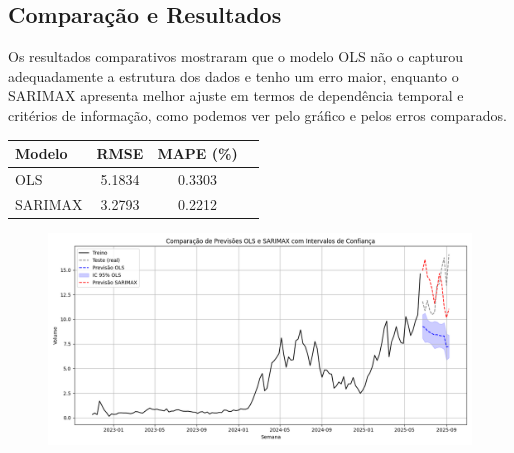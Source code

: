 \documentclass{article}
\begin{document}
\subsection*{Comparação e Resultados}
Os resultados comparativos mostraram que o modelo OLS não o  capturou adequadamente a estrutura dos dados e tenho um erro maior, enquanto o SARIMAX apresenta melhor ajuste em termos de dependência temporal e critérios de informação, como podemos ver pelo gráfico e pelos erros comparados.  

\begin{table}[h]
    \centering
    \begin{tabular}{|l|c|c|c|}
        \hline
        \textbf{Modelo}  & \textbf{RMSE} & \textbf{MAPE (\%)} \\
        \hline
        OLS & 5.1834 & 0.3303 \\
        SARIMAX  & 3.2793 & 0.2212 \\
        \hline
    \end{tabular}
    \label{tab:baseline_results}
\end{table}

\begin{figure}[h]
    \centering
    \includegraphics[width=0.75\linewidth]{images/forecast_comparison.png}
\end{figure}
\end{document}
